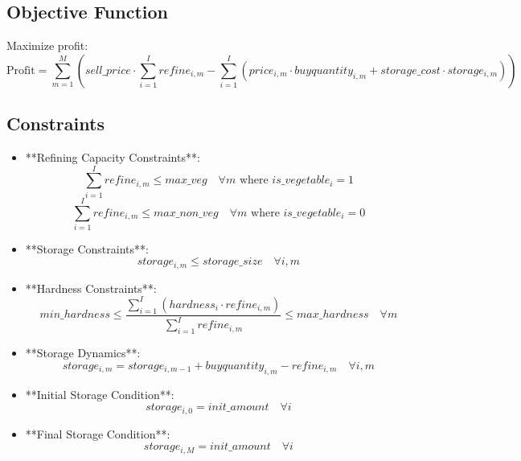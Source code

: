 \documentclass{article}
\begin{document}
\subsection*{Objective Function}
Maximize profit:
\[
\text{Profit} = \sum_{m=1}^{M} \left( sell\_price \cdot \sum_{i=1}^{I} refine_{i,m} - \sum_{i=1}^{I} (price_{i,m} \cdot buyquantity_{i,m} + storage\_cost \cdot storage_{i,m}) \right)
\]

\subsection*{Constraints}

\begin{itemize}

    \item **Refining Capacity Constraints**:
    \[
    \sum_{i=1}^{I} refine_{i,m} \leq max\_veg \quad \forall m \text{ where } is\_vegetable_{i}=1
    \]
    \[
    \sum_{i=1}^{I} refine_{i,m} \leq max\_non\_veg \quad \forall m \text{ where } is\_vegetable_{i}=0
    \]

    \item **Storage Constraints**:
    \[
    storage_{i,m} \leq storage\_size \quad \forall i, m
    \]

    \item **Hardness Constraints**:
    \[
    min\_hardness \leq \frac{\sum_{i=1}^{I} (hardness_{i} \cdot refine_{i,m})}{\sum_{i=1}^{I} refine_{i,m}} \leq max\_hardness \quad \forall m
    \]

    \item **Storage Dynamics**:
    \[
    storage_{i,m} = storage_{i,m-1} + buyquantity_{i,m} - refine_{i,m} \quad \forall i, m
    \]

    \item **Initial Storage Condition**:
    \[
    storage_{i,0} = init\_amount \quad \forall i
    \]

    \item **Final Storage Condition**:
    \[
    storage_{i,M} = init\_amount \quad \forall i
    \]
    
\end{itemize}
\end{document}
